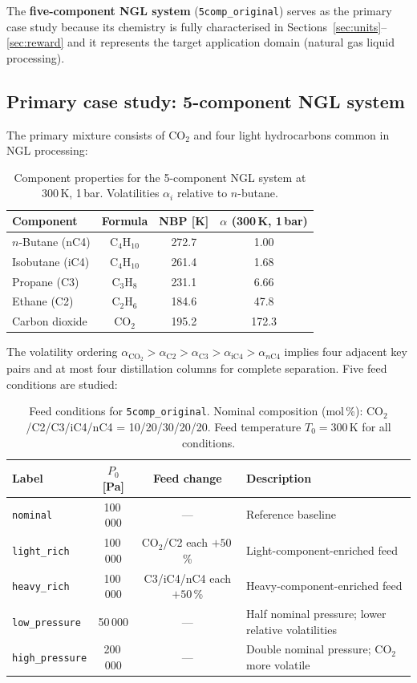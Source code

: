 \documentclass[11pt,a4paper]{article}
\theoremstyle{definition}
\theoremstyle{plain}
\begin{document}
The \textbf{five-component NGL system} (\texttt{5comp\_original}) serves as the primary case study because its chemistry is fully characterised in Sections~\ref{sec:units}--\ref{sec:reward} and it represents the target application domain (natural gas liquid processing).

\subsection{Primary case study: 5-component NGL system}
\label{sec:5comp}

The primary mixture consists of CO$_2$ and four light hydrocarbons common in NGL processing:

\begin{table}[ht]
\centering
\caption{Component properties for the 5-component NGL system
 at 300\,K, 1\,bar.
 Volatilities $\alpha_i$ relative to $n$-butane.}
\label{tab:components}
\begin{tabular}{@{}lccc@{}}
\toprule
Component & Formula & NBP [K] & $\alpha$ (300\,K, 1\,bar) \\
\midrule
$n$-Butane (nC4) & C$_4$H$_{10}$ & 272.7 & 1.00 \\
Isobutane (iC4) & C$_4$H$_{10}$ & 261.4 & 1.68 \\
Propane (C3) & C$_3$H$_8$ & 231.1 & 6.66 \\
Ethane (C2) & C$_2$H$_6$ & 184.6 & 47.8 \\
Carbon dioxide & CO$_2$ & 195.2 & 172.3 \\
\bottomrule
\end{tabular}
\end{table}

The volatility ordering $\alpha_{\mathrm{CO_2}} > \alpha_{\mathrm{C2}} > \alpha_{\mathrm{C3}} > \alpha_{\mathrm{iC4}} > \alpha_{n\mathrm{C4}}$ implies four adjacent key pairs and at most four distillation columns for complete separation. Five feed conditions are studied:

\begin{table}[ht]
\centering
\caption{Feed conditions for \texttt{5comp\_original}.
 Nominal composition (mol\,\%):
 CO$_2$/C2/C3/iC4/nC4 = 10/20/30/20/20.
 Feed temperature $T_0 = 300$\,K for all conditions.}
\label{tab:feed_conditions}
\begin{tabular}{@{}lcc p{5.5cm}@{}}
\toprule
Label & $P_0$ [Pa] & Feed change & Description \\
\midrule
\texttt{nominal}    & 100\,000 & --- &
 Reference baseline \\
\texttt{light\_rich}  & 100\,000 & CO$_2$/C2 each $+50$\,\% &
 Light-component-enriched feed \\
\texttt{heavy\_rich}  & 100\,000 & C3/iC4/nC4 each $+50$\,\% &
 Heavy-component-enriched feed \\
\texttt{low\_pressure} & 50\,000 & --- &
 Half nominal pressure; lower relative volatilities \\
\texttt{high\_pressure}& 200\,000 & --- &
 Double nominal pressure; CO$_2$ more volatile \\
\bottomrule
\end{tabular}
\end{table}
\end{document}

